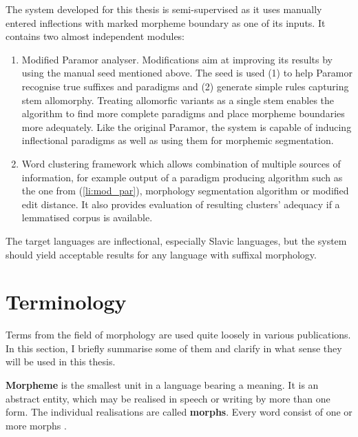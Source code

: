 The system developed for this thesis is semi-supervised as it uses manually entered inflections with marked morpheme boundary as one of its inputs. It contains two almost independent modules: 
\begin{enumerate}
\item \label{li:mod_par} Modified Paramor \citep{monson09} analyser. Modifications aim at improving its results by using the manual seed mentioned above. The seed is used (1) to help Paramor recognise true suffixes and paradigms and (2) generate simple rules capturing stem allomorphy. Treating allomorfic variants as a single stem enables the algorithm to find more complete paradigms and place morpheme boundaries more adequately. Like the original Paramor, the system is capable of inducing inflectional paradigms as well as using them for morphemic segmentation.
\item Word clustering framework which allows combination of multiple sources of information, for example output of a paradigm producing algorithm such as the one from (\ref{li:mod_par}), morphology segmentation algorithm or modified edit distance. It also provides evaluation of resulting clusters' adequacy if a lemmatised corpus is available.
\end{enumerate} 

The target languages are inflectional, especially Slavic languages, but the system should yield acceptable results for any language with suffixal morphology.

\section{Terminology}
Terms from the field of morphology are used quite loosely in various publications. In this section, I briefly summarise some of them and clarify in what sense they will be used in this thesis.

\textbf{Morpheme} is the smallest unit in a language bearing a meaning. It is an abstract entity, which may be realised in speech or writing by more than one form. The individual realisations are called \textbf{morphs}. Every word consist of one or more morphs \eg {}.

